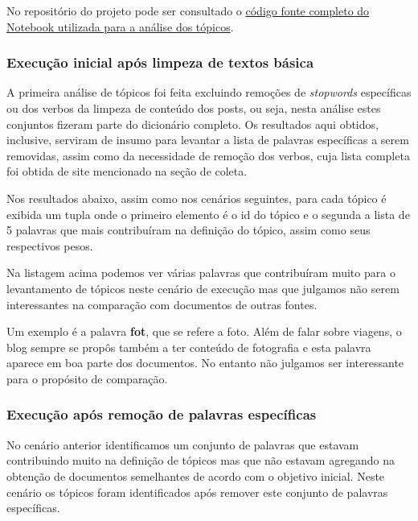

No repositório do projeto pode ser consultado o \href{https://github.com/heldergr/tcc-pucmg-2/blob/main/src/python/notebooks/nerds-viajantes-lda-analise-topicos.ipynb}{código fonte completo do Notebook utilizada para a análise dos tópicos}.

\subsubsection{Execução inicial após limpeza de textos básica}

A primeira análise de tópicos foi feita excluindo remoções de \textit{stopwords} específicas ou dos verbos da limpeza de conteúdo dos posts, ou seja,
nesta análise estes conjuntos fizeram parte do dicionário completo. Os resultados aqui obtidos, inclusive, serviram de insumo para levantar a lista
de palavras específicas a serem removidas, assim como da necessidade de remoção dos verbos, cuja lista completa foi obtida de site mencionado na seção de coleta.

Nos resultados abaixo, assim como nos cenários seguintes, para cada tópico é exibida um tupla onde o primeiro elemento é o id do tópico
e o segunda a lista de 5 palavras que mais contribuíram na definição do tópico, assim como seus respectivos pesos.



Na listagem acima podemos ver várias palavras que contribuíram muito para o levantamento de tópicos neste cenário de execução mas que julgamos não serem
interessantes na comparação com documentos de outras fontes.

Um exemplo é a palavra \textbf{fot}, que se refere a foto. Além de falar sobre viagens, o blog sempre se propôs também a ter conteúdo de fotografia e esta
palavra aparece em boa parte dos documentos. No entanto não julgamos ser interessante para o propósito de comparação.

\subsubsection{Execução após remoção de palavras específicas}

No cenário anterior identificamos um conjunto de palavras que estavam contribuindo muito na definição de tópicos mas que não estavam agregando na obtenção
de documentos semelhantes de acordo com o objetivo inicial. Neste cenário os tópicos foram identificados após remover este conjunto de palavras específicas.

